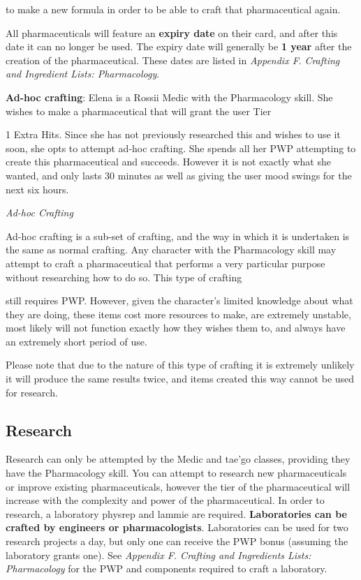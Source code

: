 \documentclass{scrbook}
\begin{document}
to make a new formula in order to be able to craft that pharmaceutical again.

All pharmaceuticals will feature an \textbf{expiry date} on their card, and after this date it can no longer be used. The expiry date will generally be \textbf{1 year} after the creation of the pharmaceutical. These dates are listed in \textit{Appendix F}. \textit{Crafting and Ingredient Lists: Pharmacology}.

\textbf{Ad-hoc crafting}: Elena is a Rossii Medic with the Pharmacology skill. She wishes to make a pharmaceutical that will grant the user Tier

1 Extra Hits. Since she has not previously researched this and wishes to use it soon, she opts to attempt ad-hoc crafting. She spends all her PWP attempting to create this pharmaceutical and succeeds. However it is not exactly what she wanted, and only lasts 30 minutes as well as giving the user mood swings for the next six hours.

\textit{Ad-hoc Crafting}

Ad-hoc crafting is a sub-set of crafting, and the way in which it is undertaken is the same as normal crafting. Any character with the Pharmacology skill may attempt to craft a pharmaceutical that performs a very particular purpose without researching how to do so. This type of crafting

still requires PWP. However, given the character's limited knowledge about what they are doing, these items cost more resources to make, are extremely unstable, most likely will not function exactly how they wishes them to, and always have an extremely short period of use.

Please note that due to the nature of this type of crafting it is extremely unlikely it will produce the same results twice, and items created this way cannot be used for research.

\subsection{Research}

Research can only be attempted by the Medic and tae'go classes, providing they have the Pharmacology skill. You can attempt to research new pharmaceuticals or improve existing pharmaceuticals, however the tier of the pharmaceutical will increase with the complexity and power of the pharmaceutical. In order to research, a laboratory physrep and lammie are required. \textbf{Laboratories can be crafted by engineers or pharmacologists}. Laboratories can be used for two research projects a day, but only one can receive the PWP bonus (assuming the laboratory grants one). See \textit{Appendix F. Crafting and Ingredients Lists:} \textit{Pharmacology} for the PWP and components required to craft a laboratory.
\end{document}
